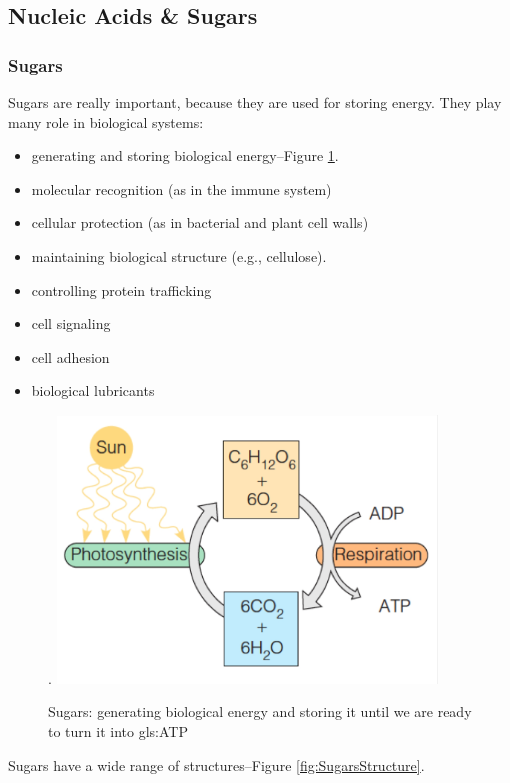 \documentclass[]{article}
\begin{document}
\subsection{Nucleic Acids \& Sugars}

\subsubsection{Sugars}

Sugars are really important, because they are used for storing energy. They play many role in biological systems:
\begin{itemize}
	\item generating and storing biological energy--Figure \ref{fig:SugarsCycle}.
	\item molecular recognition (as in the immune system)
	\item cellular protection (as in bacterial and plant cell 	walls)
	\item maintaining biological structure (e.g., cellulose).
	\item controlling protein trafficking
	\item cell signaling
	\item cell adhesion
	\item biological lubricants
\end{itemize}

\begin{figure}[H]
	\caption{Sugars: generating biological energy and storing it until we are ready to turn it into \gls{gls:ATP}}.\label{fig:SugarsCycle} 
	\includegraphics[width=0.9\textwidth]{SugarsCycle}
\end{figure}

Sugars have a wide range of structures--Figure \ref{fig:SugarsStructure}.
\end{document}
